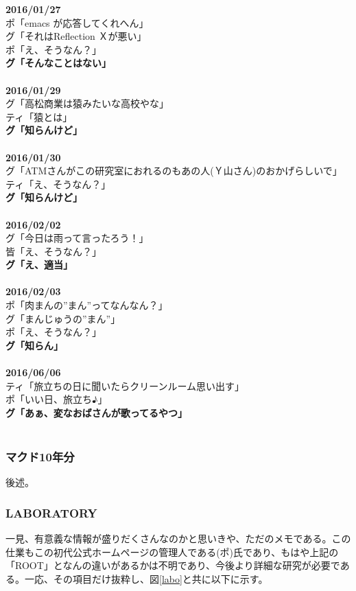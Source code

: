{\bf2016/01/27}\\
ポ「emacs が応答してくれへん」 \\
グ「それはReflection Ｘが悪い」 \\
ポ「え、そうなん？」 \\
{\Large {\bf グ「そんなことはない」}}\\
 \\
{\bf2016/01/29} \\
グ「高松商業は猿みたいな高校やな」\\ 
ティ「猿とは」 \\
{\Large {\bf グ「知らんけど」}}\\
 \\
{\bf2016/01/30} \\
グ「ATMさんがこの研究室におれるのもあの人(Ｙ山さん)のおかげらしいで」\\
ティ「え、そうなん？」 \\
{\Large {\bf グ「知らんけど」}}\\
 \\
{\bf2016/02/02}\\ 
グ「今日は雨って言ったろう！」\\ 
皆「え、そうなん？」 \\
{\Large {\bf グ「え、適当」}}\\
 \\
{\bf2016/02/03}\\ 
ポ「肉まんの”まん”ってなんなん？」\\ 
グ「まんじゅうの”まん”」\\
ポ「え、そうなん？」\\
{\Large {\bf グ「知らん」}}\\
 \\
{\bf2016/06/06}\\ 
ティ「旅立ちの日に聞いたらクリーンルーム思い出す」\\
ポ「いい日、旅立ち♪」\\
{\Large {\bf グ「あぁ、変なおばさんが歌ってるやつ」}}\\
 \\

\subsubsection{マクド10年分}
後述。

\subsubsection{LABORATORY}
一見、有意義な情報が盛りだくさんなのかと思いきや、ただのメモである。この仕業もこの初代公式ホームページの管理人である(ポ)氏であり、もはや上記の「ROOT」となんの違いがあるかは不明であり、今後より詳細な研究が必要である。一応、その項目だけ抜粋し、図\ref{labo}と共に以下に示す。

